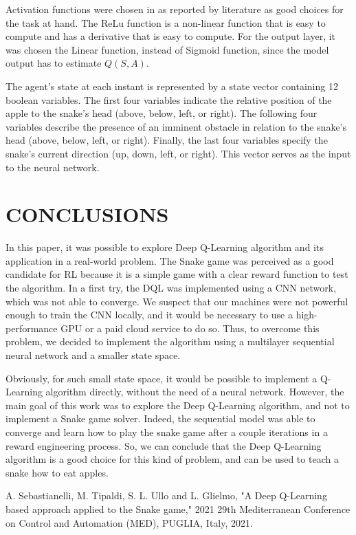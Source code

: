 \documentclass[conference]{IEEEtran}
\begin{document}
Activation functions were chosen in as reported by literature as good choices for the task at hand. The ReLu function is a non-linear function that is easy to compute and has a derivative that is easy to compute. For the output layer, it was chosen the Linear function, instead of Sigmoid function, since the model output has to estimate $Q(S,A)$.

The agent's state at each instant is represented by a state vector containing 12 boolean variables. The first four variables indicate the relative position of the apple to the snake's head (above, below, left, or right). The following four variables describe the presence of an imminent obstacle in relation to the snake's head (above, below, left, or right). Finally, the last four variables specify the snake's current direction (up, down, left, or right). This vector serves as the input to the neural network.


\section{CONCLUSIONS}

In this paper, it was possible to explore Deep Q-Learning algorithm and its application in a real-world problem. The Snake game was perceived as a good candidate for RL because it is a simple game with a clear reward function to test the algorithm. In a first try, the DQL was implemented using a CNN network, which was not able to converge. We suspect that our machines were not powerful enough to train the CNN locally, and it would be necessary to use a high-performance GPU or a paid cloud service to do so. Thus, to overcome this problem, we decided to implement the algorithm using a multilayer sequential neural network and a smaller state space.

Obviously, for such small state space, it would be possible to implement a Q-Learning algorithm directly, without the need of a neural network. However, the main goal of this work was to explore the Deep Q-Learning algorithm, and not to implement a Snake game solver. Indeed, the sequential model was able to converge and learn how to play the snake game after a couple iterations in a reward engineering process. So, we can conclude that the Deep Q-Learning algorithm is a good choice for this kind of problem, and can be used to teach a snake how to eat apples.

\begin{thebibliography}{99}
 A. Sebastianelli, M. Tipaldi, S. L. Ullo and L. Glielmo, "A Deep Q-Learning based approach applied to the Snake game," 2021 29th Mediterranean Conference on Control and Automation (MED), PUGLIA, Italy, 2021.

\end{thebibliography}
\end{document}
